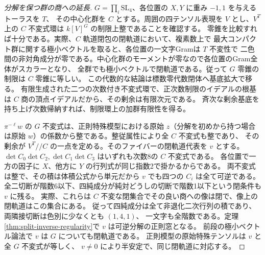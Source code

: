 \begin{proof}[分解を保つ群の商への延長]
$G=\prod_i\mathrm{SL}_4$、各位置の $X,Y$ に重み $-1,1$ を与えるトーラスを $T$、
その中心化群を $C$ とする。周囲の四テンソル表現を $V$ とし、$V^T$ 上の
$C$ 不変式環は $k[V]^G$ の制限上整であることを確認する。
零錐を比較すれば十分である。実際、$C$ 軌道閉包の閉軌道において、複素数上で
最大コンパクト群に関する極小ベクトルを取ると、各位置の一文字Gramは $T$ 不変性で
二色間の非対角成分が零である。中心化群のモーメントが零なので各位置のGram全体がスカラーとなり、
全群でも極小ベクトルで閉軌道である。従って $G$ 零錐の制限は $C$ 零錐に等しい。
この代数的な結論は標数零代数閉体へ基底拡大で移る。
有限生成された二つの次数付き不変式環で、正次数制限のイデアルの根基は
$C$ 商の頂点イデアルだから、その剰余は有限次元である。
斉次な剰余基底を持ち上げ次数帰納すれば、制限環上の加群有限性を得る。

$\pi^{-\ell}w$ の $G$ 不変式は、正則特殊模型における原始 $z$（分解を初めから持つ場合は原始 $w$）の係数から整である。整従属性により全 $C$ 不変式も整であり、
その剰余が $V^T/\!/C$ の一点を定める。そのファイバーの閉軌道代表を $v$ とする。
$\det C_0\det C_2,\det C_1\det C_3$ はいずれも次数8の $C$ 不変式である。
各位置で一方の因子に $X$、他方に $Y$ の行列式が同じ指数2で掛かるからである。
両不変式は整で、その積は体積公式から単元だから $v$ でも四つの $C_i$ は全て可逆である。
全二切断が階数6以下、四純成分が純対どうしの切断で階数1以下という閉条件も $v$ に残る。
実際、これらは $C$ 不変な閉集合でその良い商への像は閉で、像上の閉軌道はこの集合にある。
従って四純成分は全て非退化二次行列の積であり、両隣接切断は色別に少なくとも $(1,4,1)$、
一文字も全階数である。定理\ref{thm:split-inverse-regularity}で $v$ は可逆分解の正則窓となる。
前段の極小ベクトル論法で $v$ は $G$ についても閉軌道である。
正則模型の原始特殊テンソルは $v$ と全 $G$ 不変式が等しく、
$v\ne0$ により半安定で、同じ閉軌道に対応する。
\end{proof}

